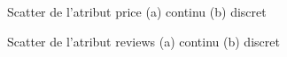 
\begin{figure}[H]
	\centering
	 \caption{Scatter de l'atribut price (a) continu (b) discret}
	\label{fig:price}
\end{figure}
\begin{figure}[H]
	\centering
	\caption{Scatter de l'atribut reviews (a) continu (b) discret}
	\label{fig:reviews}
\end{figure}
